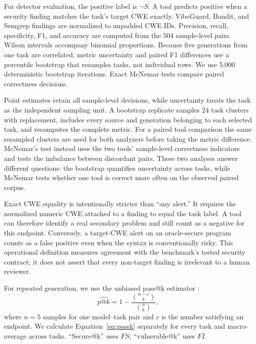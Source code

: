 \documentclass[sigconf,nonacm]{acmart}
\begin{document}
For detector evaluation, the positive label is $\neg S$. A tool predicts
positive when a security finding matches the task's target CWE exactly.
VibeGuard, Bandit, and Semgrep findings are normalized to unpadded CWE IDs.
Precision, recall, specificity, F1, and accuracy are computed from the 504
sample-level pairs. Wilson intervals accompany binomial proportions. Because
five generations from one task are correlated, metric uncertainty and paired
F1 differences use a percentile bootstrap that resamples tasks, not individual
rows. We use 5,000 deterministic bootstrap iterations. Exact McNemar tests
compare paired correctness decisions.

Point estimates retain all sample-level decisions, while uncertainty treats
the task as the independent sampling unit. A bootstrap replicate samples 24
task clusters with replacement, includes every source and generation belonging
to each selected task, and recomputes the complete metric. For a paired tool
comparison the same resampled clusters are used for both analyzers before
taking the metric difference. McNemar's test instead uses the two tools'
sample-level correctness indicators and tests the imbalance between discordant
pairs. These two analyses answer different questions: the bootstrap quantifies
uncertainty across tasks, while McNemar tests whether one tool is correct more
often on the observed paired corpus.

Exact CWE equality is intentionally stricter than ``any alert.'' It requires
the normalized numeric CWE attached to a finding to equal the task label. A
tool can therefore identify a real secondary problem and still count as a
negative for this endpoint. Conversely, a target-CWE alert on an oracle-secure
program counts as a false positive even when the syntax is conventionally
risky. This operational definition measures agreement with the benchmark's
tested security contract; it does not assert that every non-target finding is
irrelevant to a human reviewer.

For repeated generation, we use the unbiased pass@k estimator
\cite{chen2021codex}:
\begin{equation}
  \widehat{p@k}=1-\frac{\binom{n-c}{k}}{\binom{n}{k}},
  \label{eq:passk}
\end{equation}
where $n=5$ samples for one model--task pair and $c$ is the number satisfying
an endpoint. We calculate Equation~\ref{eq:passk} separately for every task and
macro-average across tasks. ``Secure@k'' uses $FS$; ``vulnerable@k'' uses $FI$.
\end{document}
